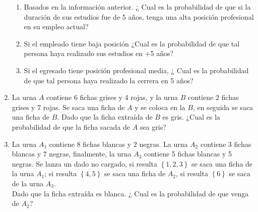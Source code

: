 \begin{enumerate}
\begin{enumerate}
\item Basados en la información anterior.  ¿ Cual es la probabilidad de que si la duración de sus estudios fue de 5 años, tenga una alta posición profesional en su empleo actual?
\item Si el empleado tiene baja posición ¿Cual es la probabilidad de que tal persona haya realizado sus estudios en +5 años?
\item Si el egresado tiene posición profesional media, ¿ Cual es la probabilidad de que tal persona haya realizado la cerrera en 5 años?
\end{enumerate}
\item La urna $A$ contiene 6 fichas grises y 4 rojas, y la urna $B$ contiene 2 fichas grises y 7 rojas. Se saca una ficha de $A$ y se coloca en la $B$, en seguida se saca una ficha de $B$. Dado que la ficha extraída de $B$ es gris. ¿Cual es la probabilidad de que la ficha sacada de $A$ sea gris?
\item La urna $A_1$ contiene 8 fichas blancas y 2 negras. La urna $A_2$ contiene 3 fichas blancas y 7 negras, finalmente, la urna $A_3$ contiene 5 fichas blancas y 5 negras. Se lanza un dado no cargado, si resulta $\left\lbrace 1,2,3\right\rbrace $ se saca una ficha de la urna $A_1$; si resulta $\left\lbrace 4,5 \right\rbrace $ se saca una ficha de $A_2$, si resulta $\left\lbrace 6 \right\rbrace $ se saca de la urna $A_3$. \\${ }$\\ Dado que la ficha extraída es blanca. ¿ Cual es la probabilidad de que venga de $A_2$?
\end{enumerate}
